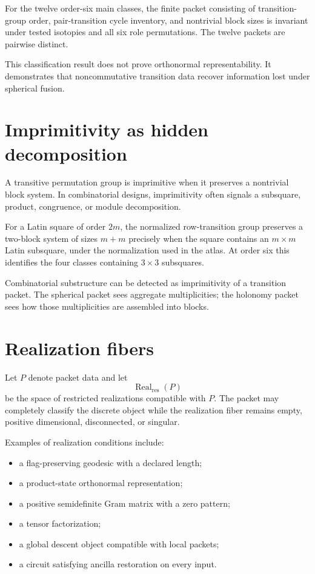 \begin{computedbox}
For the twelve order-six main classes, the finite packet consisting of transition-group order, pair-transition cycle inventory, and nontrivial block sizes is invariant under tested isotopies and all six role permutations.  The twelve packets are pairwise distinct.
\end{computedbox}
This classification result does not prove orthonormal representability.  It demonstrates that noncommutative transition data recover information lost under spherical fusion.

\section{Imprimitivity as hidden decomposition}
A transitive permutation group is imprimitive when it preserves a nontrivial block system.  In combinatorial designs, imprimitivity often signals a subsquare, product, congruence, or module decomposition.

For a Latin square of order $2m$, the normalized row-transition group preserves a two-block system of sizes $m+m$ precisely when the square contains an $m\times m$ Latin subsquare, under the normalization used in the atlas.  At order six this identifies the four classes containing $3\times3$ subsquares.

\begin{principle}
Combinatorial substructure can be detected as imprimitivity of a transition packet.  The spherical packet sees aggregate multiplicities; the holonomy packet sees how those multiplicities are assembled into blocks.
\end{principle}

\section{Realization fibers}
Let $P$ denote packet data and let
\[
\operatorname{Real}_{\mathrm{res}}(P)
\]
be the space of restricted realizations compatible with $P$.  The packet may completely classify the discrete object while the realization fiber remains empty, positive dimensional, disconnected, or singular.

Examples of realization conditions include:
\begin{itemize}
\item a flag-preserving geodesic with a declared length;
\item a product-state orthonormal representation;
\item a positive semidefinite Gram matrix with a zero pattern;
\item a tensor factorization;
\item a global descent object compatible with local packets;
\item a circuit satisfying ancilla restoration on every input.
\end{itemize}

